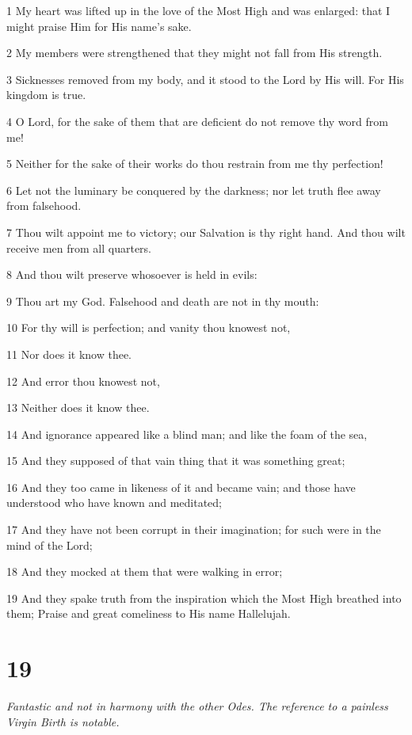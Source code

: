 \par 1 My heart was lifted up in the love of the Most High and was enlarged: that I might praise Him for His name's sake.
\par 2 My members were strengthened that they might not fall from His strength.
\par 3 Sicknesses removed from my body, and it stood to the Lord by His will. For His kingdom is true.
\par 4 O Lord, for the sake of them that are deficient do not remove thy word from me!
\par 5 Neither for the sake of their works do thou restrain from me thy perfection!
\par 6 Let not the luminary be conquered by the darkness; nor let truth flee away from falsehood.
\par 7 Thou wilt appoint me to victory; our Salvation is thy right hand. And thou wilt receive men from all quarters.
\par 8 And thou wilt preserve whosoever is held in evils:
\par 9 Thou art my God. Falsehood and death are not in thy mouth:
\par 10 For thy will is perfection; and vanity thou knowest not,
\par 11 Nor does it know thee.
\par 12 And error thou knowest not,
\par 13 Neither does it know thee.
\par 14 And ignorance appeared like a blind man; and like the foam of the sea,
\par 15 And they supposed of that vain thing that it was something great;
\par 16 And they too came in likeness of it and became vain; and those have understood who have known and meditated;
\par 17 And they have not been corrupt in their imagination; for such were in the mind of the Lord;
\par 18 And they mocked at them that were walking in error;
\par 19 And they spake truth from the inspiration which the Most High breathed into them; Praise and great comeliness to His name Hallelujah.

\chapter{19}

\par \textit{Fantastic and not in harmony with the other Odes. The reference to a painless Virgin Birth is notable.}

